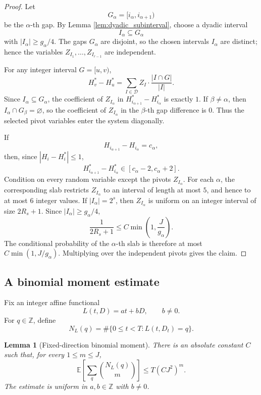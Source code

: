 \documentclass[10pt,a4paper]{amsart}
\newtheorem{lemma}[theorem]{Lemma}
\newcommand{\E}{\mathbb E}
\newcommand{\Z}{\mathbb Z}
\newcommand{\1}{\mathbf 1}
\begin{document}
\begin{proof}
Let
\[
G_\alpha=[i_\alpha,i_{\alpha+1})
\]
be the $\alpha$-th gap.  By Lemma \ref{lem:dyadic_subinterval}, choose a dyadic interval
\[
I_\alpha\subseteq G_\alpha
\]
with $|I_\alpha|\ge g_\alpha/4$.  The gaps $G_\alpha$ are disjoint, so the chosen intervals $I_\alpha$ are distinct; hence the variables $Z_{I_1},\ldots,Z_{I_{r-1}}$ are independent.

\bigskip
\noindent
For any integer interval $G=[u,v)$,
\[
H_v^*-H_u^*
=\sum_{I\in\mathcal D}Z_I\cdot\frac{|I\cap G|}{|I|}.
\]
Since $I_\alpha\subseteq G_\alpha$, the coefficient of $Z_{I_\alpha}$ in $H_{i_{\alpha+1}}^*-H_{i_\alpha}^*$ is exactly $1$.  If $\beta\ne\alpha$, then $I_\alpha\cap G_\beta=\varnothing$, so the coefficient of $Z_{I_\alpha}$ in the $\beta$-th gap difference is $0$.  Thus the selected pivot variables enter the system diagonally.

\bigskip
\noindent
If
\[
H_{i_{\alpha+1}}-H_{i_\alpha}=c_\alpha,
\]
then, since $|H_i-H_i^*|\le1$,
\[
H_{i_{\alpha+1}}^*-H_{i_\alpha}^*\in[c_\alpha-2,c_\alpha+2].
\]
Condition on every random variable except the pivots $Z_{I_\alpha}$.  For each $\alpha$, the corresponding slab restricts $Z_{I_\alpha}$ to an interval of length at most $5$, and hence to at most $6$ integer values. If $|I_\alpha|=2^s$, then $Z_{I_\alpha}$ is uniform on an integer interval of size $2R_s+1$.  Since $|I_\alpha|\ge g_\alpha/4$,
\[
\frac{1}{2R_s+1}\le C\min\left(1,\frac{J}{g_\alpha}\right).
\]
The conditional probability of the $\alpha$-th slab is therefore at most $C\min(1,J/g_\alpha)$.  Multiplying over the independent pivots gives the claim.
\end{proof}

\subsection{A binomial moment estimate}

Fix an integer affine functional
\[
L(t,D)=at+bD,
\qquad b\ne0.
\]
For $q\in\Z$, define
\[
N_L(q)=\#\{0\le t<T:L(t,D_t)=q\}.
\]

\begin{lemma}[Fixed-direction binomial moment]\label{lem:dyadic_moment}
There is an absolute constant $C$ such that, for every $1\le m\le J$,
\[
\E\left[\sum_q\binom{N_L(q)}{m}\right]
\le
T(CJ^2)^m.
\]
The estimate is uniform in $a,b\in\Z$ with $b\ne0$.
\end{lemma}
\end{document}
